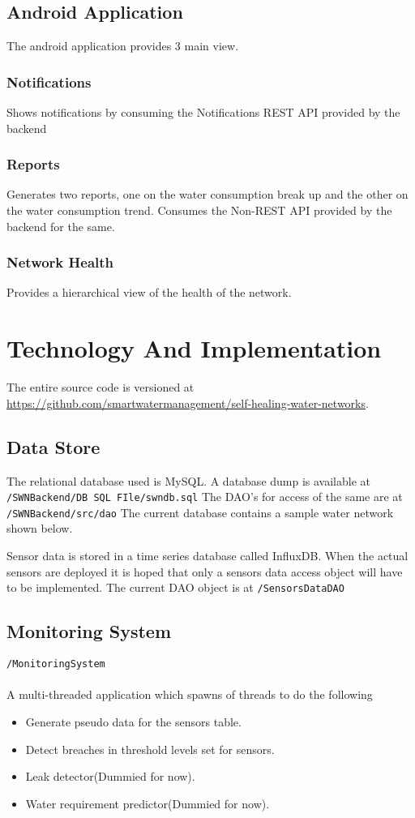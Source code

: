 \documentclass[11pt]{report} %
\begin{document}
\section{Android Application}
The android application provides 3 main view.
\subsection{Notifications}
Shows notifications by consuming the Notifications REST API provided by the backend
\subsection{Reports}
Generates two reports, one on the water consumption break up and the other on the water consumption trend. Consumes the Non-REST API provided by the backend for the same.
\subsection{Network Health}
Provides a hierarchical view of the health of the network.


\chapter{Technology And Implementation}
The entire source code is versioned at \url {https://github.com/smartwatermanagement/self-healing-water-networks}.

\section{Data Store}
The relational database used is MySQL. A database dump is available at \texttt{/SWNBackend/DB SQL FIle/swndb.sql}
The DAO's for access of the same are at \texttt{/SWNBackend/src/dao}
The current database contains a sample water network shown below.

Sensor data is stored in a time series database called InfluxDB. When the actual sensors are deployed it is hoped that only a sensors data access object will have to be implemented. The current DAO object is at \texttt{/SensorsDataDAO}

\section{Monitoring System}
\texttt{/MonitoringSystem}\\
\\
A multi-threaded application which spawns of threads to do the following
\begin{itemize}
\item Generate pseudo data for the sensors table.
\item Detect breaches in threshold levels set for sensors.
\item Leak detector(Dummied for now).
\item Water requirement predictor(Dummied for now).
\end{itemize}
\end{document}
